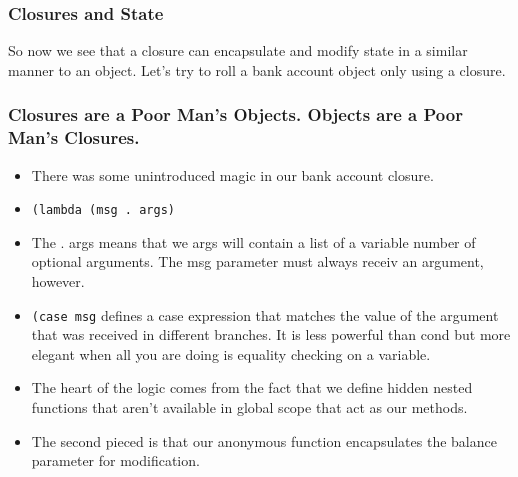 \documentclass{beamer}
\begin{document}
\begin{frame}
  \frametitle{Closures and State}
  \huge So now we see that a closure can encapsulate and modify state
  in a similar manner to an object. Let's try to roll a bank account
  object only using a closure. 
\end{frame}

\begin{frame}
  \bankAccountClosure
\end{frame}

\begin{frame}
  \frametitle{Closures are a Poor Man's Objects. Objects are a Poor Man's Closures.}
  \begin{itemize}
  \item<2-> There was some unintroduced magic in our bank account closure.
  \item<3-> \texttt{(lambda (msg . args)}
  \item<4-> The . args means that we args will contain a list of a variable
    number of optional arguments. The msg parameter must always  receiv
    an argument, however.
  \item<5-> \texttt{(case msg} defines a case expression that
    matches the value of the argument that was received in different branches.
    It is less powerful than cond but more elegant when all you are doing
    is equality checking on a variable.
  \item<6-> The heart of the logic comes from the fact that we define hidden
    nested functions that aren't available in global scope that act as our
    methods.
  \item<7-> The second pieced is that our anonymous function encapsulates
    the balance parameter for modification.
  \end{itemize}
\end{frame}
\end{document}
